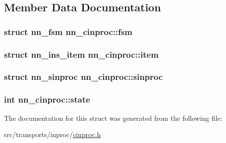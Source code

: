 \subsection{Member Data Documentation}
\subsubsection[{fsm}]{\setlength{\rightskip}{0pt plus 5cm}struct {\bf nn\+\_\+fsm} nn\+\_\+cinproc\+::fsm}\hypertarget{structnn__cinproc_a4944b367109e6d3fc2927fe52f4139f5}{}\label{structnn__cinproc_a4944b367109e6d3fc2927fe52f4139f5}
\subsubsection[{item}]{\setlength{\rightskip}{0pt plus 5cm}struct {\bf nn\+\_\+ins\+\_\+item} nn\+\_\+cinproc\+::item}\hypertarget{structnn__cinproc_a23852b5c008f49703409ebf04148891a}{}\label{structnn__cinproc_a23852b5c008f49703409ebf04148891a}
\subsubsection[{sinproc}]{\setlength{\rightskip}{0pt plus 5cm}struct {\bf nn\+\_\+sinproc} nn\+\_\+cinproc\+::sinproc}\hypertarget{structnn__cinproc_ab7ebfae31cd5c060a85329f21f7e12f0}{}\label{structnn__cinproc_ab7ebfae31cd5c060a85329f21f7e12f0}
\subsubsection[{state}]{\setlength{\rightskip}{0pt plus 5cm}int nn\+\_\+cinproc\+::state}\hypertarget{structnn__cinproc_ab01665c985955fbff04ad753615c030b}{}\label{structnn__cinproc_ab01665c985955fbff04ad753615c030b}


The documentation for this struct was generated from the following file\+:\begin{DoxyCompactItemize}
\item 
src/transports/inproc/\hyperlink{cinproc_8h}{cinproc.\+h}\end{DoxyCompactItemize}
